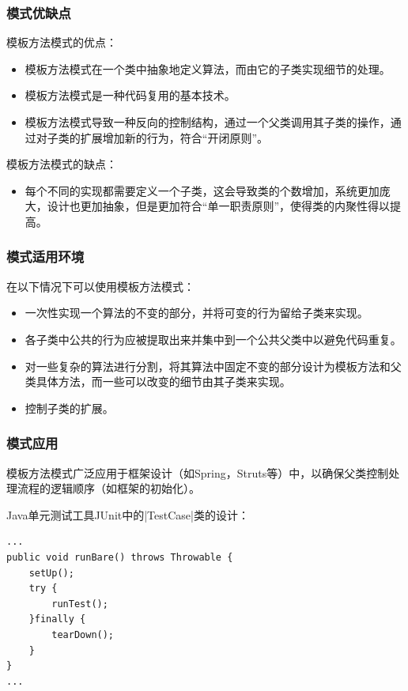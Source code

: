\subsubsection{模式优缺点}
模板方法模式的优点：
\begin{itemize}
    \item 模板方法模式在一个类中抽象地定义算法，而由它的子类实现细节的处理。
    \item 模板方法模式是一种代码复用的基本技术。
    \item 模板方法模式导致一种反向的控制结构，通过一个父类调用其子类的操作，通过对子类的扩展增加新的行为，符合“开闭原则”。
\end{itemize}

模板方法模式的缺点：
\begin{itemize}
    \item 每个不同的实现都需要定义一个子类，这会导致类的个数增加，系统更加庞大，设计也更加抽象，但是更加符合“单一职责原则”，使得类的内聚性得以提高。
\end{itemize}

\subsubsection{模式适用环境}
在以下情况下可以使用模板方法模式：
\begin{itemize}
    \item 一次性实现一个算法的不变的部分，并将可变的行为留给子类来实现。
    \item 各子类中公共的行为应被提取出来并集中到一个公共父类中以避免代码重复。
    \item 对一些复杂的算法进行分割，将其算法中固定不变的部分设计为模板方法和父类具体方法，而一些可以改变的细节由其子类来实现。
    \item 控制子类的扩展。
\end{itemize}

\subsubsection{模式应用}
 模板方法模式广泛应用于框架设计（如Spring，Struts等）中，以确保父类控制处理流程的逻辑顺序（如框架的初始化）。

 Java单元测试工具JUnit中的\sverb|TestCase|\;类的设计：
\begin{lstlisting}
...
public void runBare() throws Throwable {
    setUp();
    try {
        runTest(); 
    }finally { 
        tearDown();
    }
}
...
\end{lstlisting}

